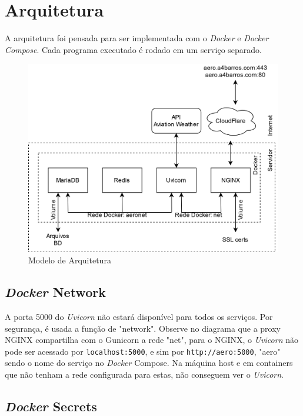 \chapter{Arquitetura}

A arquitetura foi pensada para ser implementada com o \textit{\textit{Docker}} e \textit{\textit{Docker} Compose}. Cada
programa executado é rodado em um serviço separado.

\begin{figure}[ht]
    \begin{center}
    \includegraphics[width=\linewidth]{img/arquitetura.png}
    \caption{Modelo de Arquitetura}
    \label{fig:arquitetura}
    \end{center}
\end{figure}

\section{\textit{Docker} Network}
A porta 5000 do \textit{Uvicorn} não estará disponível para todos os serviços. Por segurança, é usada a função de
"network". Observe no diagrama que a proxy NGINX compartilha com o Gunicorn a rede "net", para o NGINX,
o \textit{Uvicorn} não pode ser acessado por \texttt{localhost:5000}, e sim por \texttt{http://aero:5000}, "aero"
sendo o nome do serviço no \textit{Docker} Compose. Na máquina host e em containers que não tenham a rede
configurada para estas, não conseguem ver o \textit{Uvicorn}.


\section{\textit{Docker} Secrets}

